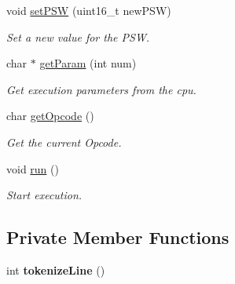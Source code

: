 \begin{DoxyCompactItemize}
void \hyperlink{classcCPU_adb6ad793398d28b5615dd1377a619084}{set\-P\-S\-W} (uint16\-\_\-t new\-P\-S\-W)
\begin{DoxyCompactList}\small\item\em \-Set a new value for the \-P\-S\-W. \end{DoxyCompactList}\item 
char $\ast$ \hyperlink{classcCPU_a891d9b77e1818ca247e9d76f4db99415}{get\-Param} (int num)
\begin{DoxyCompactList}\small\item\em \-Get execution parameters from the cpu. \end{DoxyCompactList}\item 
char \hyperlink{classcCPU_a987e1ab511c71dcde48411f5bb16f9d8}{get\-Opcode} ()
\begin{DoxyCompactList}\small\item\em \-Get the current \-Opcode. \end{DoxyCompactList}\item 
void \hyperlink{classcCPU_aee300d68026ba9f13d5434ff82f0372a}{run} ()
\begin{DoxyCompactList}\small\item\em \-Start execution. \end{DoxyCompactList}\end{DoxyCompactItemize}
\subsection*{\-Private \-Member \-Functions}
\begin{DoxyCompactItemize}
\item 
\hypertarget{classcCPU_a62812ecc1a65c296fb4795b24b451f4e}{int {\bfseries tokenize\-Line} ()}\label{d2/dc6/classcCPU_a62812ecc1a65c296fb4795b24b451f4e}

\end{DoxyCompactItemize}
